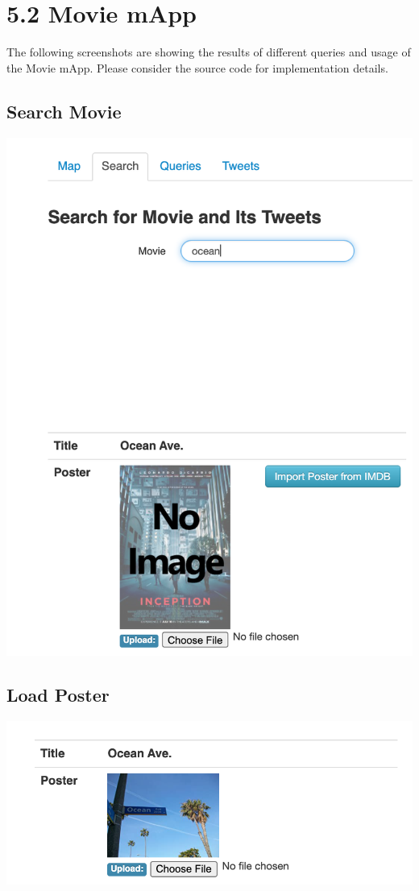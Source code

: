 \documentclass[ngerman]{dis-template-add}
\begin{document}
\section*{5.2 Movie mApp}

The following screenshots are showing the results of different queries and usage of the Movie mApp. Please consider the source code for implementation details.

\subsection*{Search Movie}
\includegraphics[scale=0.3]{1-movie_search.png}

\subsection*{Load Poster}
\includegraphics[scale=0.3]{2-load_image.png}
\end{document}
